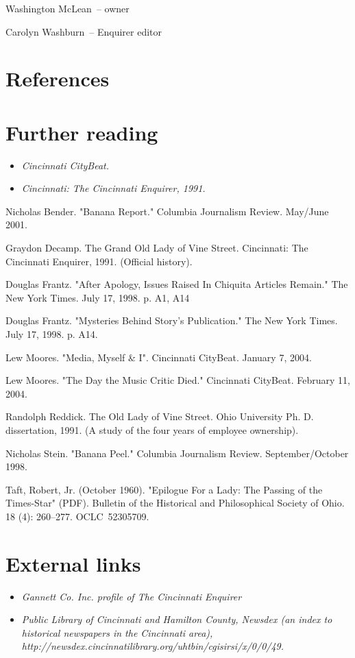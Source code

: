 Washington McLean~-- owner

Carolyn Washburn~-- Enquirer editor

\section{References}\label{references}

\section{Further reading}\label{further-reading}

\begin{itemize}
\item
  \emph{Cincinnati CityBeat.}
\item
  \emph{Cincinnati: The Cincinnati Enquirer, 1991.}
\end{itemize}

Nicholas Bender. "Banana Report." Columbia Journalism Review. May/June
2001.

Graydon Decamp. The Grand Old Lady of Vine Street. Cincinnati: The
Cincinnati Enquirer, 1991. (Official history).

Douglas Frantz. "After Apology, Issues Raised In Chiquita Articles
Remain." The New York Times. July 17, 1998. p. A1, A14

Douglas Frantz. "Mysteries Behind Story's Publication." The New York
Times. July 17, 1998. p. A14.

Lew Moores. "Media, Myself \& I". Cincinnati CityBeat. January 7, 2004.

Lew Moores. "The Day the Music Critic Died." Cincinnati CityBeat.
February 11, 2004.

Randolph Reddick. The Old Lady of Vine Street. Ohio University Ph. D.
dissertation, 1991. (A study of the four years of employee ownership).

Nicholas Stein. "Banana Peel." Columbia Journalism Review.
September/October 1998.

Taft, Robert, Jr. (October 1960). "Epilogue For a Lady: The Passing of
the Times-Star" (PDF). Bulletin of the Historical and Philosophical
Society of Ohio. 18 (4): 260--277. OCLC~52305709.

\section{External links}\label{external-links}

\begin{itemize}
\item
  \emph{Gannett Co. Inc. profile of The Cincinnati Enquirer}
\item
  \emph{Public Library of Cincinnati and Hamilton County, Newsdex (an
  index to historical newspapers in the Cincinnati area),
  http://newsdex.cincinnatilibrary.org/uhtbin/cgisirsi/x/0/0/49.}
\end{itemize}

